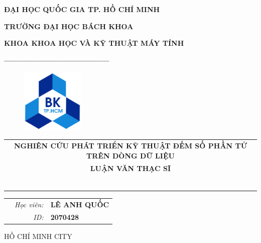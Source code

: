 \documentclass[a4paper,11pt]{article}
\theoremstyle{mytheor}
\begin{document}
\begin{titlepage}
\begin{center} {\textbf{ĐẠI HỌC QUỐC GIA TP. HỒ CHÍ MINH}
}

{\textbf{TRƯỜNG ĐẠI HỌC BÁCH KHOA}
}

{\textbf{KHOA KHOA HỌC VÀ KỸ THUẬT MÁY TÍNH }
}

{\textbf{---------------------------------------}}

\end{center}

\vspace{1cm}

\begin{figure}[h!]
\begin{center}
\includegraphics[width=3cm]{hcmut.png}
\end{center}
\end{figure}

\vspace{2cm}


\begin{center}
\begin{tabular}{c}
\multicolumn{1}{c}{\textbf{\Large NGHIÊN CỨU PHÁT TRIỂN KỸ THUẬT ĐẾM SỐ PHẦN TỬ TRÊN DÒNG DỮ LIỆU}}
\vspace{2cm}
\\
\multicolumn{1}{c}{\textbf{\Large LUẬN VĂN THẠC SĨ}}


~~\\

\\
\multicolumn{1}{l}{\textbf{{\Large}}}\\
\\
\textbf{{\Large}}\\

\\
\\

\end{tabular}
\end{center}

\vspace{1cm}

\begin{table}[h]
\begin{tabular}{rrl}
\hspace{5.1cm} 
&\textit{Học viên: } & \textbf{LÊ ANH QUỐC}\\
&\textit{ID: } & \textbf{2070428}\\

\end{tabular}
\end{table}
\vspace{3cm}
\begin{center}
{\footnotesize HỒ CHÍ MINH CITY}
\end{center}
\end{titlepage}
\end{document}
